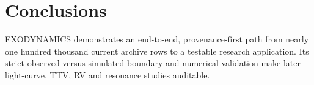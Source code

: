 \documentclass[twocolumn]{aastex631}
\begin{document}
\section{Conclusions}
EXODYNAMICS demonstrates an end-to-end, provenance-first path from nearly one hundred thousand current archive rows to a testable research application. Its strict observed-versus-simulated boundary and numerical validation make later light-curve, TTV, RV and resonance studies auditable.



\end{document}
